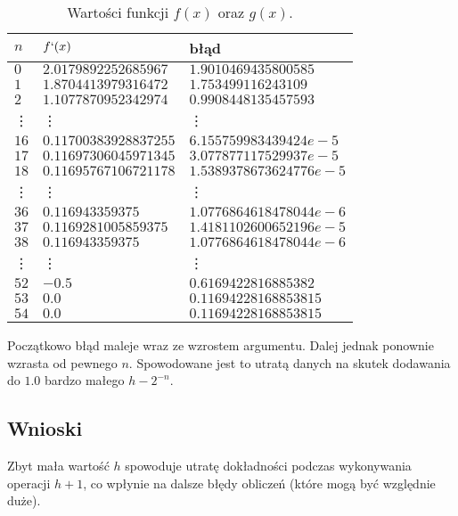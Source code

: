 \documentclass{classrep}
\begin{document}
		\begin{table}[h!]
        	\centering
        	\footnotesize
			\begin{tabular}{lll} \toprule
				$n$ & $f`(x)$ & błąd \\ \midrule
				$0$ & $2.0179892252685967$ & $1.9010469435800585$ \\ 
 				$1$ & $1.8704413979316472$ & $1.753499116243109$ \\
 				$2$ & $1.1077870952342974$ & $0.9908448135457593$ \\
 				\vdots & \vdots & \vdots \\
				$16$ & $0.11700383928837255$ & $6.155759983439424e-5$ \\
				$17$ & $0.11697306045971345$	& $3.077877117529937e-5$ \\
				$18$ & $0.11695767106721178$ & $1.5389378673624776e-5$ \\ 				
				\vdots & \vdots & \vdots \\
 				$36$ & $0.116943359375$ & $1.0776864618478044e-6$ \\
 				$37$ & $0.1169281005859375$ & $1.4181102600652196e-5$ \\
 				$38$ & $0.116943359375$ & $1.0776864618478044e-6$ \\
 				\vdots & \vdots & \vdots \\
 				$52$ & $-0.5$ & $0.6169422816885382$ \\
 				$53$ & $0.0$ & $0.11694228168853815$ \\
 				$54$ & $0.0$ & $0.11694228168853815$ \\\bottomrule
 			\end{tabular}
 			\caption{Wartości funkcji $f(x)$ oraz $g(x)$.}
			\label{table:10}
		\end{table}		
		Początkowo błąd maleje wraz ze wzrostem argumentu. Dalej jednak ponownie wzrasta od pewnego $n$. Spowodowane jest to utratą danych na skutek
		dodawania do $1.0$ bardzo małego $h-2^{-n}$.		
	\subsection{Wnioski}
	Zbyt mała wartość $h$ spowoduje utratę dokładności podczas wykonywania operacji $h+1$, co wpłynie na dalsze błędy obliczeń 
	(które mogą być względnie duże).
\end{document}
